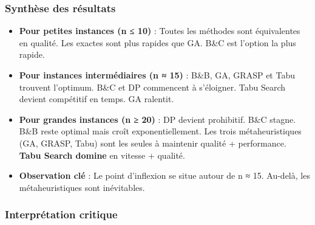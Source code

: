 \documentclass[11pt,a4paper]{article}
\begin{document}
\subsubsection*{Synthèse des résultats}

\begin{itemize}
    \item \textbf{Pour petites instances (n ≤ 10)} : Toutes les méthodes sont équivalentes en qualité. Les exactes sont plus rapides que GA. B\&C est l'option la plus rapide.
    
    \item \textbf{Pour instances intermédiaires (n ≈ 15)} : B\&B, GA, GRASP et Tabu trouvent l'optimum. B\&C et DP commencent à s'éloigner. Tabu Search devient compétitif en temps. GA ralentit.
    
    \item \textbf{Pour grandes instances (n ≥ 20)} : DP devient prohibitif. B\&C stagne. B\&B reste optimal mais croît exponentiellement. Les trois métaheuristiques (GA, GRASP, Tabu) sont les seules à maintenir qualité + performance. \textbf{Tabu Search domine} en vitesse + qualité.
    
    \item \textbf{Observation clé} : Le point d'inflexion se situe autour de n ≈ 15. Au-delà, les métaheuristiques sont inévitables.
\end{itemize}

\subsubsection*{Interprétation critique}
\end{document}
